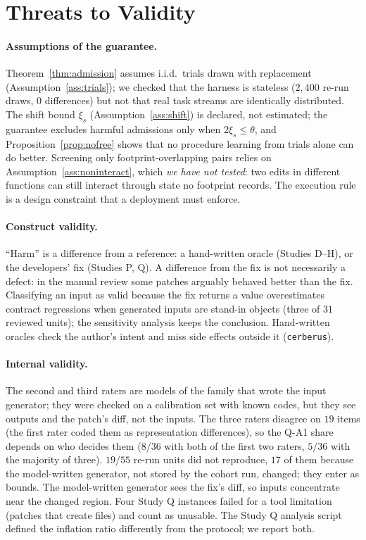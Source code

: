 \section{Threats to Validity}
\label{sec:threats}

\paragraph{Assumptions of the guarantee.}
Theorem~\ref{thm:admission} assumes i.i.d.\ trials drawn with replacement (Assumption~\ref{ass:trials}); we checked that the
harness is stateless ($2{,}400$ re-run draws, $0$ differences) but not that real task streams are identically distributed.
The shift bound $\xi_s$ (Assumption~\ref{ass:shift}) is declared, not estimated; the guarantee excludes harmful admissions only
when $2\xi_s\le\theta$, and Proposition~\ref{prop:nofree} shows that no procedure learning from trials alone can do better.
Screening only footprint-overlapping pairs relies on Assumption~\ref{ass:noninteract}, which \emph{we have not tested}: two edits in
different functions can still interact through state no footprint records.  The execution rule is a design constraint that a
deployment must enforce.

\paragraph{Construct validity.}
``Harm'' is a difference from a reference: a hand-written oracle (Studies D--H), or the developers' fix (Studies P, Q).  A
difference from the fix is not necessarily a defect: in the manual review some patches arguably behaved better than the fix.
Classifying an input as valid because the fix returns a value overestimates contract regressions when generated inputs are
stand-in objects (three of $31$ reviewed units); the sensitivity analysis keeps the conclusion.  Hand-written oracles check the
author's intent and miss side effects outside it (\texttt{cerberus}).

\paragraph{Internal validity.}
The second and third raters are models of the family that wrote the input generator; they were checked on a calibration set
with known codes, but they see outputs and the patch's diff, not the inputs.  The three raters disagree on $19$ items (the first
rater coded them as representation differences), so the Q-A1 share depends on who decides them ($8/36$ with both of the first
two raters, $5/36$ with the majority of three).  $19/55$ re-run units did not reproduce, $17$ of them because the model-written
generator, not stored by the cohort run, changed; they enter as bounds.  The model-written generator sees the fix's diff, so
inputs concentrate near the changed region.  Four Study Q instances failed for a tool limitation (patches that create files) and
count as unusable.  The Study Q analysis script defined the inflation ratio differently from the protocol; we report both.

